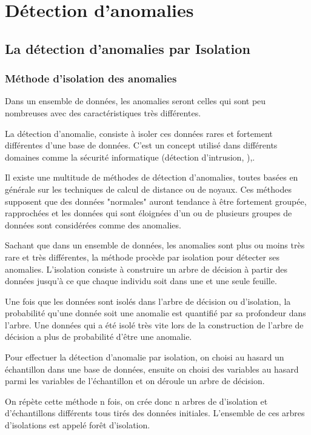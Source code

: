 \part{Détection d'anomalies}
\label{prt:detection}

\chapter{La détection d'anomalies par Isolation} 

\section{Méthode d'isolation des anomalies}

Dans un ensemble de données, les anomalies seront celles qui sont peu nombreuses avec des caractéristiques très différentes.

La détection d'anomalie, consiste à isoler ces données rares et fortement différentes d'une base de données. C'est un concept utilisé dans différents domaines comme la sécurité informatique (détection d'intrusion, ),.

Il existe une multitude de méthodes de détection d'anomalies, toutes basées en générale sur les techniques de calcul de distance ou de noyaux. Ces méthodes supposent que des données "normales" auront tendance à être fortement groupée, rapprochées et les données qui sont éloignées d'un ou de plusieurs groupes de données sont considérées comme des anomalies.

Sachant que dans un ensemble de données, les anomalies sont plus ou moins très rare et très différentes, la méthode procède par isolation pour détecter ses anomalies. L'isolation consiste à construire un arbre de décision à partir des données jusqu'à ce que chaque individu soit dans une et une seule feuille.

Une fois que les données sont isolés dans l'arbre de décision ou d'isolation, la probabilité qu'une donnée soit une anomalie est quantifié par sa profondeur dans l'arbre. Une données qui a été isolé très vite lors de la construction de l'arbre de décision a plus de probabilité d'être une anomalie.

Pour effectuer la détection d'anomalie par isolation, on choisi au hasard un échantillon dans une base de données, ensuite on choisi des variables au hasard parmi les variables de l'échantillon et on déroule un arbre de décision.

On répète cette méthode n fois, on crée donc n arbres de d'isolation et d'échantillons différents tous tirés des données initiales. L'ensemble de ces arbres d'isolations est appelé forêt d'isolation.

